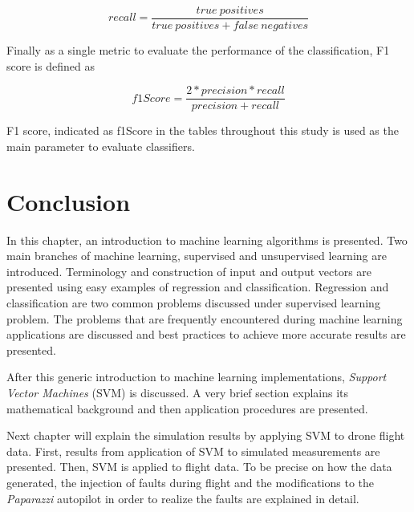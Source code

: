 \begin{equation}
recall = \frac{true \ positives}{true \ positives + false \ negatives}
\end{equation}

Finally as a single metric to evaluate the performance of the classification, F1 score is defined as

\begin{equation}
f1Score = \frac{2 * precision * recall}{precision + recall}
\end{equation}

F1 score, indicated as f1Score in the tables throughout this study is used as the main parameter to evaluate classifiers.

\section{Conclusion}
In this chapter, an introduction to machine learning algorithms is presented. 
Two main branches of machine learning, supervised and unsupervised learning are introduced. 
Terminology and construction of input and output vectors are presented using easy examples of regression and classification. 
Regression and classification are two common problems discussed under supervised learning problem. 
The problems that are frequently encountered during machine learning applications are discussed and best practices to achieve more accurate results are presented. 

After this generic introduction to machine learning implementations, \emph{Support Vector Machines} (SVM) is discussed.  
A very brief section explains its mathematical background and then application procedures are presented.

Next chapter will explain the simulation results by applying SVM to drone flight data. First, results from application of SVM to simulated measurements are presented. Then, SVM is applied to flight data. To be precise on how the data generated, the injection of faults during flight and the modifications to the \emph{Paparazzi} autopilot in order to realize the faults are explained in detail.